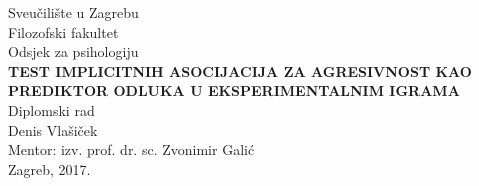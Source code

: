 \documentclass[a4paper, 12pt]{report}
\begin{document}
\begin{titlepage}
    \begin{center}
{Sveučilište u Zagrebu\\
    Filozofski fakultet\\
    Odsjek za psihologiju\\}
\vspace{9.5cm}
{\bfseries TEST IMPLICITNIH ASOCIJACIJA ZA AGRESIVNOST KAO PREDIKTOR
    ODLUKA U EKSPERIMENTALNIM IGRAMA\\}
    Diplomski rad\\
\vspace{5cm}
Denis Vlašiček\\[0.7cm]
Mentor: izv. prof. dr. sc. Zvonimir Galić\\
\vspace{\fill}
Zagreb, 2017.
    \end{center}
\end{titlepage}

\setcounter{secnumdepth}{0} 
\tableofcontents
\thispagestyle{empty}
\end{document}
